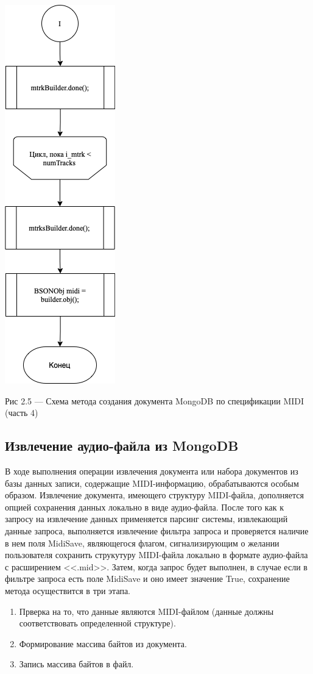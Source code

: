 \begin{center}
		\includegraphics[scale=0.7]{tex/img/Parser4-2.png}
		
			Рис 2.5 — Схема метода создания документа MongoDB по спецификации MIDI (часть 4)
\end{center}

\subsection{Извлечение аудио-файла из MongoDB}

В ходе выполнения операции извлечения документа или набора документов из базы данных записи, содержащие MIDI-информацию, обрабатываются особым образом. Извлечение документа, имеющего структуру MIDI-файла, дополняется опцией сохранения данных локально в виде аудио-файла. После того как к запросу на извлечение данных применяется парсинг системы, извлекающий данные запроса, выполняется извлечение фильтра запроса и проверяется наличие в нем поля MidiSave, являющегося флагом, сигнализирующим о желании пользователя сохранить струкутуру MIDI-файла локально в формате аудио-файла с расширением <<.mid>>. Затем, когда запрос будет выполнен, в случае если в фильтре запроса есть поле MidiSave и оно имеет значение True, сохранение метода осуществится в три этапа.
\begin{enumerate}
\item Прверка на то, что данные являются MIDI-файлом (данные должны
соответствовать определенной структуре).
\item Формирование массива байтов из документа.
\item Запись массива байтов в файл.
\end{enumerate}

